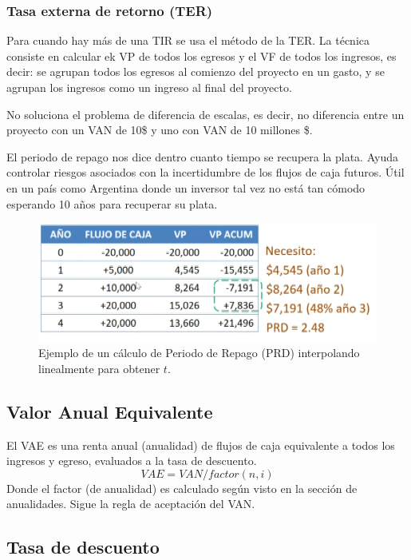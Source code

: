 \documentclass[twocolumn,10pt]{article}
\begin{document}
\subsubsection{Tasa externa de retorno (TER)}

Para cuando hay más de una TIR se usa el método de la TER. La técnica consiste en calcular ek VP de todos los egresos y el VF de todos los ingresos, es decir: se agrupan todos los egresos al comienzo del proyecto en un gasto, y se agrupan los ingresos como un ingreso al final del proyecto.

No soluciona el problema de diferencia de escalas, es decir, no diferencia entre un proyecto con un VAN de 10\$ y uno con VAN de 10 millones \$.

El periodo de repago nos dice dentro cuanto tiempo se recupera la plata. Ayuda controlar riesgos asociados con la incertidumbre de los flujos de caja futuros. Útil en un país como Argentina donde un inversor tal vez no está tan cómodo esperando 10 años para recuperar su plata.


\begin{figure}
	\centering
	\includegraphics[width=0.9\linewidth]{fig/ej_periodoRepago.png}
	\caption{Ejemplo de un cálculo de Periodo de Repago (PRD) interpolando linealmente para obtener $t$.}
	\label{fig:periodoRepagoEjemplo}
\end{figure}

\subsection{Valor Anual Equivalente}
El VAE es una renta anual (anualidad) de flujos de caja equivalente a todos los ingresos y egreso, evaluados a la tasa de descuento.
\[
	VAE = VAN / factor(n,i)
\]
Donde el factor (de anualidad) es calculado según visto en la sección de anualidades. Sigue la regla de aceptación del VAN.

\subsection{Tasa de descuento}
\end{document}
